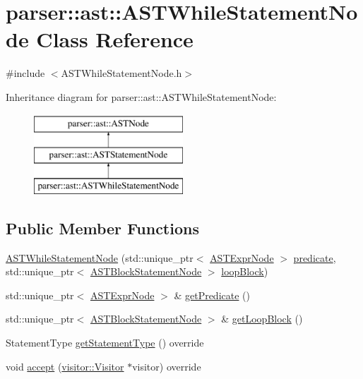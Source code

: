 \hypertarget{classparser_1_1ast_1_1ASTWhileStatementNode}{}\section{parser\+:\+:ast\+:\+:A\+S\+T\+While\+Statement\+Node Class Reference}
\label{classparser_1_1ast_1_1ASTWhileStatementNode}


{\ttfamily \#include $<$A\+S\+T\+While\+Statement\+Node.\+h$>$}

Inheritance diagram for parser\+:\+:ast\+:\+:A\+S\+T\+While\+Statement\+Node\+:\begin{figure}[H]
\begin{center}
\leavevmode
\includegraphics[height=3.000000cm]{dd/d51/classparser_1_1ast_1_1ASTWhileStatementNode}
\end{center}
\end{figure}
\subsection*{Public Member Functions}
\begin{DoxyCompactItemize}
\item 
\hyperlink{classparser_1_1ast_1_1ASTWhileStatementNode_a099a29ffe3bca12fac6a7904d52b9c6a}{A\+S\+T\+While\+Statement\+Node} (std\+::unique\+\_\+ptr$<$ \hyperlink{classparser_1_1ast_1_1ASTExprNode}{A\+S\+T\+Expr\+Node} $>$ \hyperlink{classparser_1_1ast_1_1ASTWhileStatementNode_aef13a0ab19cfd381066af8c066e341e1}{predicate}, std\+::unique\+\_\+ptr$<$ \hyperlink{classparser_1_1ast_1_1ASTBlockStatementNode}{A\+S\+T\+Block\+Statement\+Node} $>$ \hyperlink{classparser_1_1ast_1_1ASTWhileStatementNode_ae88c633373308600c37d89db84980363}{loop\+Block})
\item 
std\+::unique\+\_\+ptr$<$ \hyperlink{classparser_1_1ast_1_1ASTExprNode}{A\+S\+T\+Expr\+Node} $>$ \& \hyperlink{classparser_1_1ast_1_1ASTWhileStatementNode_af0a556a314a4b06858d8f47c94e64b86}{get\+Predicate} ()
\item 
std\+::unique\+\_\+ptr$<$ \hyperlink{classparser_1_1ast_1_1ASTBlockStatementNode}{A\+S\+T\+Block\+Statement\+Node} $>$ \& \hyperlink{classparser_1_1ast_1_1ASTWhileStatementNode_a17d4d7573477af83900a6dda33c29e78}{get\+Loop\+Block} ()
\item 
Statement\+Type \hyperlink{classparser_1_1ast_1_1ASTWhileStatementNode_a47ad4212e8bae1bbe602918044e39cd8}{get\+Statement\+Type} () override
\item 
void \hyperlink{classparser_1_1ast_1_1ASTWhileStatementNode_a448a46d9dbde688562ada266192735c8}{accept} (\hyperlink{classvisitor_1_1Visitor}{visitor\+::\+Visitor} $\ast$visitor) override
\end{DoxyCompactItemize}
